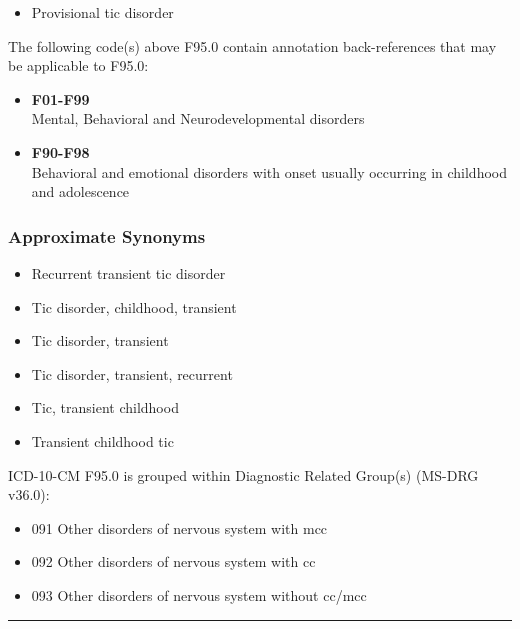 \begin{paracol}{2}
\begin{leftcolumn}
\begin{itemize}
\tightlist
\item
  Provisional tic disorder
\end{itemize}

\noindent The following code(s) above F95.0 contain annotation back-references that may be applicable to F95.0:

\begin{itemize}
\tightlist
\item
  \textbf{F01-F99}\\
  Mental, Behavioral and Neurodevelopmental disorders
\item
  \textbf{F90-F98}\\
  Behavioral and emotional disorders with onset usually occurring in childhood and adolescence
\end{itemize}

\hypertarget{approximate-synonyms}{%
\subsubsection{Approximate Synonyms}\label{approximate-synonyms}}

\begin{itemize}
\tightlist
\item
  Recurrent transient tic disorder
\item
  Tic disorder, childhood, transient
\item
  Tic disorder, transient
\item
  Tic disorder, transient, recurrent
\item
  Tic, transient childhood
\item
  Transient childhood tic
\end{itemize}

\noindent ICD-10-CM F95.0 is grouped within Diagnostic Related Group(s) (MS-DRG v36.0):

\begin{itemize}
\tightlist
\item
  091 Other disorders of nervous system with mcc
\item
  092 Other disorders of nervous system with cc
\item
  093 Other disorders of nervous system without cc/mcc
\end{itemize}

\begin{center}\rule{0.5\linewidth}{\linethickness}\end{center}


\end{leftcolumn}
\end{paracol}
